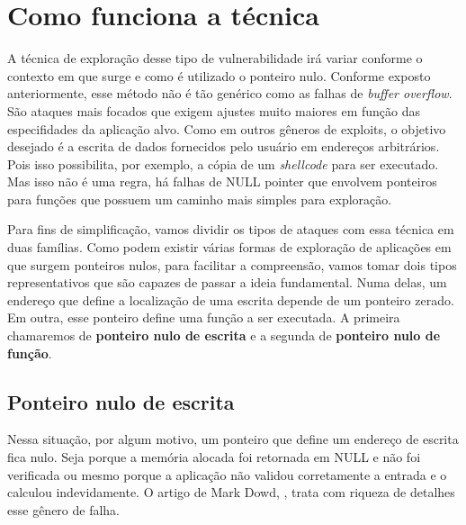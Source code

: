 	\section{Como funciona a técnica}
		A técnica de exploração desse tipo de vulnerabilidade irá variar conforme o contexto
		em que surge e como é utilizado o ponteiro nulo. 
		Conforme exposto anteriormente, esse método não é tão genérico como as falhas de \textsl{buffer overflow}.
		São ataques mais focados que exigem ajustes muito maiores em função das especifidades da aplicação alvo.
		Como em outros gêneros de exploits, o objetivo desejado é a escrita de dados fornecidos 
		pelo usuário em endereços arbitrários. Pois isso possibilita, por exemplo,
		a cópia de um \textsl{shellcode} para ser executado. Mas isso não é uma regra, há falhas
		de NULL pointer que envolvem ponteiros para funções que possuem um caminho mais simples
		para exploração.

	
		Para fins de simplificação, vamos dividir os tipos de ataques com essa técnica em duas famílias.
		Como podem existir várias formas de exploração de aplicações em que surgem ponteiros nulos,
		para facilitar a compreensão, vamos tomar dois tipos representativos que são capazes de passar
		a ideia fundamental.
		Numa delas, um endereço que define a localização de uma escrita depende de um ponteiro zerado.
		Em outra, esse ponteiro define uma função a ser executada.
		A primeira chamaremos de \textbf{ponteiro nulo de escrita} e a segunda de \textbf{ponteiro nulo de função}.


		\subsection{Ponteiro nulo de escrita}
		\label{subsec:ponteiro_escrita}
			Nessa situação, por algum motivo, um ponteiro que define um endereço de escrita fica nulo.
			Seja porque a memória alocada foi retornada em NULL e não foi verificada ou mesmo porque
			a aplicação não validou corretamente a entrada e o calculou indevidamente.
			O artigo de Mark Dowd, \cite{Dowd2008}, trata com riqueza de detalhes esse gênero de falha.
			

